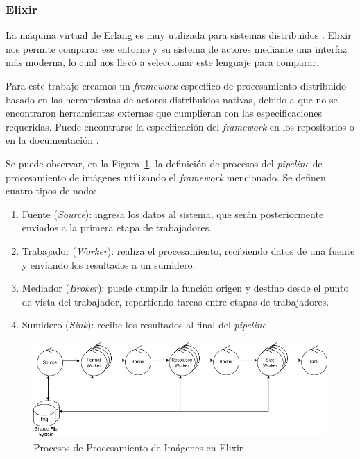 \documentclass[11pt]{article}
\let\Oldsubsubsection\subsubsection
\renewcommand{\subsubsection}{\FloatBarrier\Oldsubsubsection}
\newcommand{\english}[1]{\textit{#1}}
\begin{document}
\subsubsection{Elixir}

La máquina virtual de Erlang es muy utilizada para sistemas distribuidos \cite{elx:ex:companies} \cite{scala:lib:rabbit}. Elixir nos permite comparar ese entorno y su sistema de actores mediante una interfaz más moderna, lo cual nos llevó a seleccionar este lenguaje para comparar.

Para este trabajo creamos un \english{framework} específico de procesamiento distribuido basado en las herramientas de actores distribuidos nativas, debido a que no se encontraron herramientas externas que cumplieran con las especificaciones requeridas. Puede encontrarse la especificación del \english{framework} en los repositorios o en la documentación \cite{repos:docs}.

Se puede observar, en la Figura~\ref{fig:elx:image_processing_framework}, la definición de procesos del \english{pipeline} de procesamiento de imágenes utilizando el \english{framework} mencionado. Se definen cuatro tipos de nodo:
\begin{enumerate}
\item Fuente (\english{Source}): ingresa los datos al sistema, que serán posteriormente enviados a la primera etapa de trabajadores.
    \item Trabajador (\english{Worker}): realiza el procesamiento, recibiendo datos de una fuente y enviando los resultados a un sumidero.
    \item Mediador (\english{Broker}): puede cumplir la función origen y destino desde el punto de vista del trabajador, repartiendo tareas entre etapas de trabajadores.
    \item  Sumidero (\english{Sink}): recibe los resultados al final del \english{pipeline}
\end{enumerate}

\begin{figure}[ht]
    \centering
    \includegraphics[scale=0.4]{resources/distributed_systems/elixir/image_processing_framework.png}
    \caption{Procesos de Procesamiento de Imágenes en Elixir}
    \label{fig:elx:image_processing_framework}
\end{figure}
\end{document}
